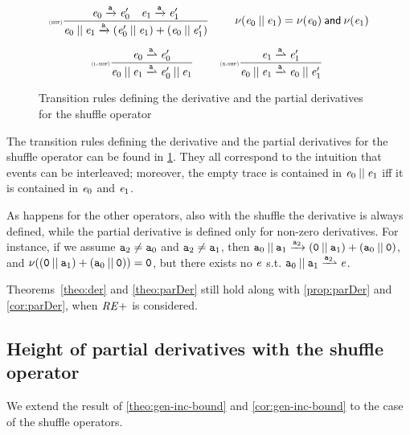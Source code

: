 \begin{figure}[h]
 $$
  \begin{array}{c}
   \Rule{shf}{\re_0\der{\sym}\re'_0\quad\re_1\der{\sym}\re'_1}{\re_0\shuffleop\re_1\der{\sym}(\re'_0\shuffleop\re_1)\orop(\re_0\shuffleop\re'_1)}{}\qquad \hasEps{\re_0\shuffleop\re_1}=\hasEps{\re_0}\conj\hasEps{\re_1} \\[4ex]
   \Rule{l-shf}{\re_0\parDer{\sym}\re'_0}{\re_0\shuffleop\re_1\parDer{\sym}\re'_0\shuffleop\re_1}{} \qquad
   \Rule{r-shf}{\re_1\parDer{\sym}\re'_1}{\re_0\shuffleop\re_1\parDer{\sym}\re_0\shuffleop\re'_1}{}
  \end{array}
 $$
 \caption{Transition rules defining the derivative and the partial derivatives for the shuffle operator}
 \label{fig:shfParDer}
\end{figure}

The transition rules defining the derivative and the partial derivatives for the shuffle operator
can be found in \cref{fig:shfParDer}. They all correspond to the intuition that events can be interleaved; moreover, the empty trace is contained in $\mathit {e}_0\mathbin{||}\mathit {e}_1$ iff it is contained in $\mathit {e}_0$ and $\mathit {e}_1$.

As happens for the other operators, also with the shuffle  the derivative is always defined, while the partial derivative is defined only for non-zero derivatives. For instance, if we assume $\mathtt {a}_2\neq\mathtt {a}_0$ and $\mathtt {a}_2\neq\mathtt {a}_1$, then
$\mathtt {a}_0\mathbin{||} \mathtt {a}_1\xrightarrow{\mathtt {a}_2}(\mathtt {0}\mathbin{||}\mathtt {a}_1)\mathbin{+}(\mathtt {a}_0\mathbin{||}\mathtt {0})$, and $\nu({(\mathtt {0}\mathbin{||}\mathtt {a}_1)\mathbin{+}(\mathtt {a}_0\mathbin{||}\mathtt {0})})=\mathtt {0}$, but there exists no $\mathit {e}$ s.t.
$\sym_0\shuffleop \sym_1\parDer{\sym_2}\re$.

Theorems~\ref{theo:der} and \ref{theo:parDer} still hold along with  \cref{prop:parDer} and \cref{cor:parDer}, when $\mathit {RE+}$ is considered.

\subsection{Height of partial derivatives with the shuffle operator}

We extend the result of \cref{theo:gen-inc-bound} and \cref{cor:gen-inc-bound} to the case of the shuffle operators.

